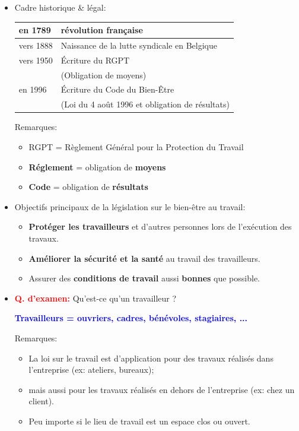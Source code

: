 \documentclass[a4paper]{article}
\begin{document}
\begin{itemize}





\item Cadre historique \& légal:
\begin{center}
    \begin{tabular}{|l|p{8cm}|} \hline
        en 1789 & révolution française \\ \hline
        vers 1888 & Naissance de la lutte syndicale en Belgique \\ \hline
        vers 1950 & Écriture du RGPT \\
        & (Obligation de moyens) \\ \hline
        en 1996 & Écriture du Code du Bien-Être \\
        & (Loi du 4 août 1996 et obligation de résultats) \\ \hline
    \end{tabular}
\end{center}
Remarques:
\begin{itemize}
    \item RGPT = Règlement Général pour la Protection du Travail
    \item \textbf{Réglement} = obligation de \textbf{moyens}
    \item \textbf{Code} = obligation de \textbf{résultats}
\end{itemize}





\item Objectifs principaux de la législation sur le bien-être au travail:
\begin{itemize}
    \item \textbf{Protéger les travailleurs} et d’autres personnes lors de l’exécution des travaux.
    \item \textbf{Améliorer la sécurité et la santé} au travail des travailleurs.
    \item Assurer des \textbf{conditions de travail} aussi \textbf{bonnes} que possible.
\end{itemize}





\item \textcolor{red}{\textbf{Q. d'examen:}} Qu'est-ce qu'un travailleur ?
\begin{center}
    \textcolor{blue}{\textbf{Travailleurs = ouvriers, cadres, bénévoles, stagiaires, ...}}
\end{center}
Remarques:
\begin{itemize}
    \item La loi sur le travail est d’application pour des travaux réalisés dans l'entreprise (ex: ateliers, bureaux);
    \item mais aussi pour les travaux réalisés en dehors de l’entreprise (ex: chez un client).
    \item Peu importe si le lieu de travail est un espace clos ou ouvert.
\end{itemize}






\end{itemize}
\end{document}
